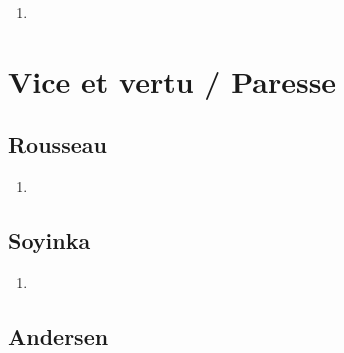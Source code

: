 \documentclass[a4paper, 11pt, hidelinks]{article}
\begin{document}
\begin{enumerate}
    \item 
\end{enumerate}

























\section{Vice et vertu / Paresse}



\subsection{Rousseau}


\begin{enumerate}
    \item 
\end{enumerate}



\subsection{Soyinka}


\begin{enumerate}
    \item 
\end{enumerate}




\subsection{Andersen}
\end{document}
